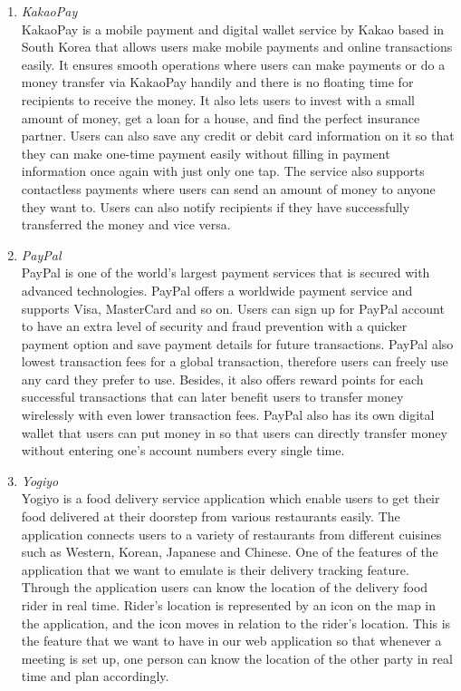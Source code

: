 \documentclass[conference]{IEEEtran}
\begin{document}
\begin{enumerate}
\item \textit{KakaoPay }\\ 
KakaoPay is a mobile payment and digital wallet service by Kakao based in \indent South Korea that allows users make mobile payments and online transactions easily. It ensures smooth operations where users can make payments or do a money transfer via KakaoPay handily and there is no floating time for recipients to receive the money. It also lets users to invest with a small amount of money, get a loan for a house, and find the perfect insurance partner. Users can also save any credit or debit card information on it so that they can make one-time payment easily without filling in payment information once again with just only one tap. The service also supports contactless payments where users can send an amount of money to anyone they want to. Users can also notify recipients if they have successfully transferred the money and vice versa. \\
\item \textit{PayPal} \\
PayPal is one of the world’s largest payment services that is secured with advanced technologies. PayPal offers a worldwide payment service and supports Visa, MasterCard and so on. Users can sign up for PayPal account to have an extra level of security and fraud prevention with a quicker payment option and save payment details for future transactions. PayPal also lowest transaction fees for a global transaction, therefore users can freely use any card they prefer to use. Besides, it also offers reward points for each successful transactions that can later benefit users to transfer money wirelessly with even lower transaction fees. PayPal also has its own digital wallet that users can put money in so that users can directly transfer money without entering one’s account numbers every single time.\\
\item \textit{Yogiyo }\\
Yogiyo is a food delivery service application which enable users to get their food delivered at their doorstep from various restaurants easily. The application connects users to a variety of restaurants from different cuisines such as Western, Korean, Japanese and Chinese. One of the features of the application that we want to emulate is their delivery tracking feature. Through the application users can know the location of the delivery food rider in real time. Rider’s location is represented by an icon on the map in the application, and the icon moves in relation to the rider’s location. This is the feature that we want to have in our web application so that whenever a meeting is set up, one person can know the location of the other party in real time and plan accordingly.\\

\end{enumerate}
\end{document}
